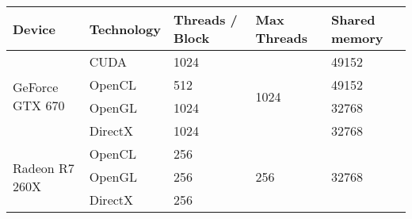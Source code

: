 \begin{tabular}{|l|l|l|l|l|}
	\hline
	Device & Technology & Threads / Block & Max Threads & Shared memory \\ \hline
	\multirow{4}{*}{GeForce GTX 670} & CUDA & 1024 & \multirow{4}{*}{1024} & 49152 \\
	& OpenCL & 512 & {} & 49152 \\
	& OpenGL & 1024 & {} & 32768 \\
	& DirectX & 1024 & {} & 32768 \\ \hline
	\multirow{3}{*}{Radeon R7 260X} & OpenCL & 256 & \multirow{3}{*}{256} & \multirow{3}{*}{32768} \\
	& OpenGL & 256 & {} & {} \\
	& DirectX & 256 & {} & {} \\ \hline
\end{tabular}